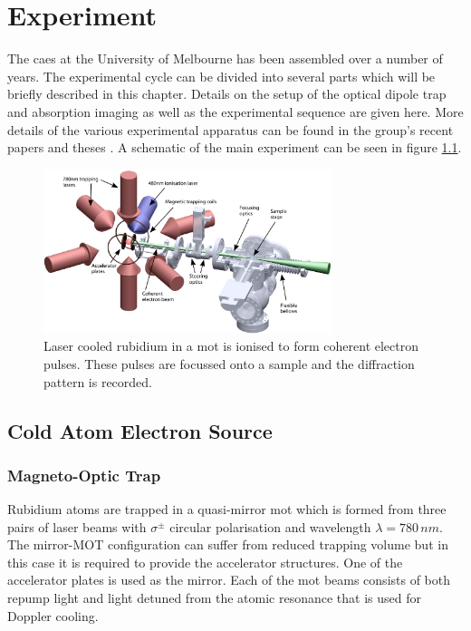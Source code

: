 \chapter{Experiment}

The \gls{caes} at the University of Melbourne has been assembled over a number of years. The experimental cycle can be divided into several parts which will be briefly described in this chapter. Details on the setup of the optical dipole trap and absorption imaging as well as the experimental sequence are given here. More details of the various experimental apparatus can be found in the group's recent papers \cite{bell_slow_2010, mcculloch_arbitrarily_2011, saliba_spatial_2012} and theses \cite{mcculloch_towards_2012, sheludko_shaped_2010, saliba_partially_2011}. A schematic of the main experiment can be seen in figure \ref{fig:experiment}.

\begin{figure}[h]
\centering
\includegraphics[width=0.75\textwidth]{figs/MOT_and_sample.pdf}
\caption{Laser cooled rubidium in a \protect\gls{mot} is ionised to form coherent electron pulses. These pulses are focussed onto a sample and the diffraction pattern is recorded.}
\label{fig:experiment}
\end{figure}

\section{Cold Atom Electron Source}
\subsection{Magneto-Optic Trap}
Rubidium atoms are trapped in a quasi-mirror \gls{mot} which is formed from three pairs of laser beams with $\sigma^\pm$ circular polarisation and wavelength $\lambda=780\,\unit{nm}$. The mirror-MOT configuration can suffer from reduced trapping volume\cite{reichel_atomic_1999} but in this case it is required to provide the accelerator structures. One of the accelerator plates is used as the mirror. Each of the \gls{mot} beams consists of both repump light and light detuned from the atomic resonance that is used for Doppler cooling.

